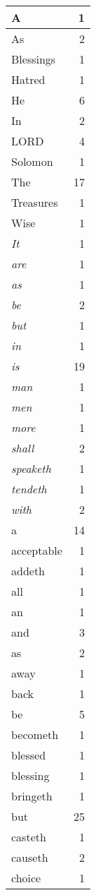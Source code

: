 \begin{center}
\begin{longtable}{l|r}
A & 1\\ \hline 
As & 2\\ \hline 
Blessings & 1\\ \hline 
Hatred & 1\\ \hline 
He & 6\\ \hline 
In & 2\\ \hline 
LORD & 4\\ \hline 
Solomon & 1\\ \hline 
The & 17\\ \hline 
Treasures & 1\\ \hline 
Wise & 1\\ \hline 
\emph{It} & 1\\ \hline 
\emph{are} & 1\\ \hline 
\emph{as} & 1\\ \hline 
\emph{be} & 2\\ \hline 
\emph{but} & 1\\ \hline 
\emph{in} & 1\\ \hline 
\emph{is} & 19\\ \hline 
\emph{man} & 1\\ \hline 
\emph{men} & 1\\ \hline 
\emph{more} & 1\\ \hline 
\emph{shall} & 2\\ \hline 
\emph{speaketh} & 1\\ \hline 
\emph{tendeth} & 1\\ \hline 
\emph{with} & 2\\ \hline 
a & 14\\ \hline 
acceptable & 1\\ \hline 
addeth & 1\\ \hline 
all & 1\\ \hline 
an & 1\\ \hline 
and & 3\\ \hline 
as & 2\\ \hline 
away & 1\\ \hline 
back & 1\\ \hline 
be & 5\\ \hline 
becometh & 1\\ \hline 
blessed & 1\\ \hline 
blessing & 1\\ \hline 
bringeth & 1\\ \hline 
but & 25\\ \hline 
casteth & 1\\ \hline 
causeth & 2\\ \hline 
choice & 1\\ \hline 

\end{longtable}
\end{center}
